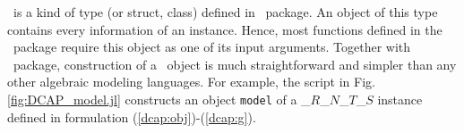\subsubsection{\jumpmodel}
\jumpmodel\ is a kind of type (or struct, class) defined in \jump\ package. An object of this type contains every information of an instance. Hence, most functions defined in the \siplibtwo\ package require this object as one of its input arguments. Together with \structjump\ package, construction of a \jumpmodel\ object is much straightforward and simpler than any other algebraic modeling languages. For example, the script in Fig. \ref{fig:DCAP_model.jl} constructs an object \texttt{model} of a \dcap\_$R$\_$N$\_$T$\_$S$ instance defined in formulation (\ref{dcap:obj})-(\ref{dcap:g}).
%
%
